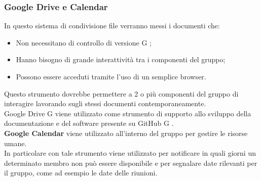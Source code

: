 \documentclass[a4paper,12pt]{article}
\begin{document}
{\subsubsection{Google Drive e Calendar }
{
In questo sistema di condivisione file verranno messi i documenti che:
\begin{itemize}
\item Non necessitano di controllo di versione G ; 
\item Hanno bisogno di grande interattività tra i componenti del gruppo; 
\item Possono essere acceduti tramite l’uso di un semplice browser. 
\end{itemize} 
Questo strumento dovrebbe permettere a 2 o più componenti del gruppo di interagire lavorando sugli stessi documenti contemporaneamente.\\ 
Google Drive G viene utilizzato come strumento di supporto allo sviluppo della documentazione e del software presente su GitHub G .\\
\textbf{Google Calendar} viene utilizzato all’interno del gruppo per gestire le risorse umane.\\ 
In particolare con tale strumento viene utilizzato per notificare in quali giorni un determinato membro non può essere disponibile e per segnalare date rilevanti per il gruppo, 
come ad esempio le date delle riunioni. 
}
}
\end{document}
